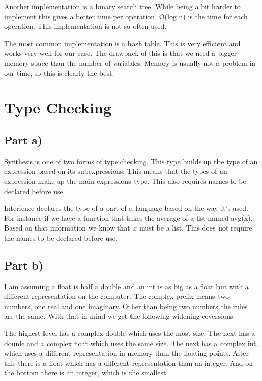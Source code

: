 \documentclass[paper=a4, fontsize=11pt]{scrartcl} %
\numberwithin{equation}{section} %
\numberwithin{figure}{section} %
\numberwithin{table}{section} %
\begin{document}
Another implementation is a binary search tree.
While being a bit harder to implement this gives a better time per operation.
O(log n) is the time for each operation.
This implementation is not so often used.

The most common implementation is a hash table.
This is very efficient and works very well for our case.
The drawback of this is that we need a bigger memory space than the number of variables.
Memory is usually not a problem in our time, so this is clearly the best.
\section{Type Checking}
\subsection{Part a)}
Synthesis is one of two forms of type checking.
This type builds up the type of an expression based on its subexpressions.
This means that the types of an expression make up the main expressions type.
This also requires names to be declared before use.

Interfence declares the type of a part of a language based on the way it's used.
For instance if we have a function that takes the average of a list named avg(x).
Based on that information we know that $x$ must be a list.
This does not require the names to be declared before use.
\subsection{Part b)}
I am assuming a float is half a double and an int is as big as a float but with a different representation on the computer.
The complex prefix means two numbers, one real and one imaginary. Other than being two numbers the rules are the same.
With that in mind we get the following widening coversions.

The highest level has a complex double which uses the most size.
The next has a dounle and a complex float which uses the same size.
The next has a complex int, which uses a different representation in memory than the floating points.
After this there is a float which has a different representation than an integer.
And on the bottom there is an integer, which is the smallest.
\end{document}
